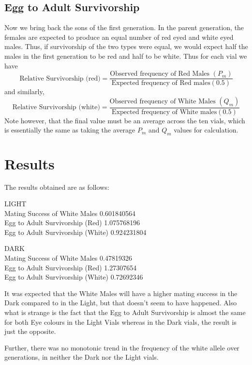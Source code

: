	\subsection{Egg to Adult Survivorship}
		Now we bring back the sons of the first generation. In the parent generation, the females are expected to produce an equal number of red eyed and white eyed males. Thus, if survivorship of the two types were equal, we would expect half the males in the first generation to be red and half to be white. Thus for each vial we have
		\begin{equation}
			\text{Relative Survivorship (red)}=\frac{\text{Observed frequency of Red Males } (P_m)}{\text{Expected frequency of Red males} (0.5)}
		\end{equation}
		and similarly,
		\begin{equation}
			\text{Relative Survivorship (white)}=\frac{\text{Observed frequency of White Males } (Q_m)}{\text{Expected frequency of White males} (0.5)}
		\end{equation}
		Note however, that the final value must be an average across the ten vials, which is essentially the same as taking the average $P_m$ and $Q_m$ values for calculation.
\section{Results}
The results obtained are as follows:
\par
LIGHT\\
Mating Success of White Males				0.601840564\\
Egg to Adult Survivorship (Red)				1.075768196\\
Egg to Adult Survivorship (White)			0.924231804\\
\par
DARK\\
Mating Success of White Males				0.47819326\\			
Egg to Adult Survivorship (Red)				1.27307654\\
Egg to Adult Survivorship (White)			0.72692346\\
\par
It was expected that the White Males will have a higher mating success in the Dark compared to in the Light, but that doesn't seem to have happened. Also what is strange is the fact that the Egg to Adult Survivorship is almost the same for both Eye colours in the Light Vials whereas in the Dark vials, the result is just the opposite.
\par
Further, there was no monotonic trend in the frequency of the white allele over generations, in neither the Dark nor the Light vials.

